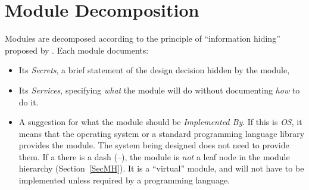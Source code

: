 \section{Module Decomposition}\label{SecMD}
Modules are decomposed according to the principle of ``information hiding''
proposed by \citet{ParnasEtAl1984}. Each module documents:
\begin{itemize}

    \item Its \emph{Secrets}, a brief statement of the design decision hidden 
    by the module, 

    \item Its \emph{Services}, specifying \emph{what} the module will do 
    without documenting \emph{how} to do it.

    \item A suggestion for what the module should be \emph{Implemented By}. If 
    this is \emph{OS}, it means that the operating system or a standard 
    programming language library provides the module. The system being designed 
    does not need to provide them. If a there is a dash (\emph{--}), the module 
    is \textit{not} a leaf node in the module hierarchy (Section~\ref{SecMH}). 
    It is a ``virtual'' module, and will not have to be implemented unless 
    required by a programming language.

\end{itemize}



